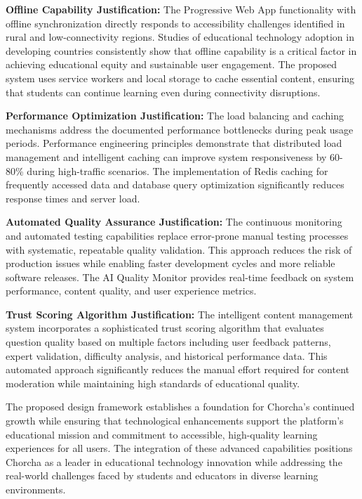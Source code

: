 \documentclass[12pt,a4paper,oneside]{book}
\begin{document}
\textbf{Offline Capability Justification:}
The Progressive Web App functionality with offline synchronization directly responds to accessibility challenges identified in rural and low-connectivity regions. Studies of educational technology adoption in developing countries consistently show that offline capability is a critical factor in achieving educational equity and sustainable user engagement. The proposed system uses service workers and local storage to cache essential content, ensuring that students can continue learning even during connectivity disruptions.

\textbf{Performance Optimization Justification:}
The load balancing and caching mechanisms address the documented performance bottlenecks during peak usage periods. Performance engineering principles demonstrate that distributed load management and intelligent caching can improve system responsiveness by 60-80\% during high-traffic scenarios. The implementation of Redis caching for frequently accessed data and database query optimization significantly reduces response times and server load.

\textbf{Automated Quality Assurance Justification:}
The continuous monitoring and automated testing capabilities replace error-prone manual testing processes with systematic, repeatable quality validation. This approach reduces the risk of production issues while enabling faster development cycles and more reliable software releases. The AI Quality Monitor provides real-time feedback on system performance, content quality, and user experience metrics.

\textbf{Trust Scoring Algorithm Justification:}
The intelligent content management system incorporates a sophisticated trust scoring algorithm that evaluates question quality based on multiple factors including user feedback patterns, expert validation, difficulty analysis, and historical performance data. This automated approach significantly reduces the manual effort required for content moderation while maintaining high standards of educational quality.

The proposed design framework establishes a foundation for Chorcha's continued growth while ensuring that technological enhancements support the platform's educational mission and commitment to accessible, high-quality learning experiences for all users. The integration of these advanced capabilities positions Chorcha as a leader in educational technology innovation while addressing the real-world challenges faced by students and educators in diverse learning environments.
\end{document}
